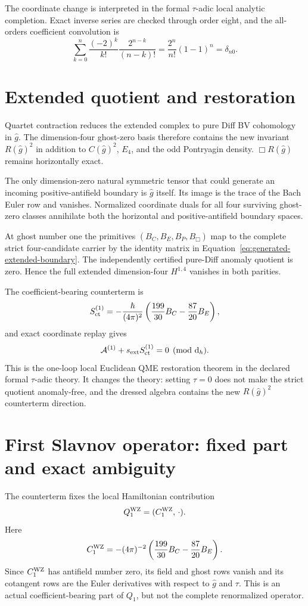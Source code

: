 \documentclass[11pt]{article}
\theoremstyle{definition}
\theoremstyle{remark}
\newcommand{\cA}{\mathcal A}
\newcommand{\dd}{\mathrm d}
\begin{document}
The coordinate change is interpreted in the formal $\tau$-adic local analytic
completion.  Exact inverse series are checked through order eight, and the
all-orders coefficient convolution is
\[
 \sum_{k=0}^{n}\frac{(-2)^k}{k!}\frac{2^{n-k}}{(n-k)!}
 =\frac{2^n}{n!}(1-1)^n=\delta_{n0}.
\]

\section{Extended quotient and restoration}

Quartet contraction reduces the extended complex to pure Diff BV cohomology
in $\widehat g$.  The dimension-four ghost-zero basis therefore contains the
new invariant $R(\widehat g)^2$ in addition to $C(\widehat g)^2$, $E_4$, and
the odd Pontryagin density.  $\Box R(\widehat g)$ remains horizontally exact.

The only dimension-zero natural symmetric tensor that could generate an
incoming positive-antifield boundary is $\widehat g$ itself.  Its image is the
trace of the Bach Euler row and vanishes.  Normalized coordinate duals for all
four surviving ghost-zero classes annihilate both the horizontal and
positive-antifield boundary spaces.

At ghost number one the primitives
$(B_C,B_E,B_P,B_{\Box})$ map to the complete strict four-candidate carrier by
the identity matrix in Equation~\ref{eq:generated-extended-boundary}.  The
independently certified pure-Diff anomaly quotient is zero.  Hence the full
extended dimension-four $H^{1,4}$ vanishes in both parities.

The coefficient-bearing counterterm is
\[
 S_{\rm ct}^{(1)}
 =-\frac{\hbar}{(4\pi)^2}
 \left(\frac{199}{30}B_C-\frac{87}{20}B_E\right),
\]
and exact coordinate replay gives
\[
 \cA^{(1)}+s_{\rm ext}S_{\rm ct}^{(1)}=0\pmod{\dd_h}.
\]
This is the one-loop local Euclidean QME restoration theorem in the declared
formal $\tau$-adic theory.  It changes the theory: setting $\tau=0$ does not
make the strict quotient anomaly-free, and the dressed algebra contains the
new $R(\widehat g)^2$ counterterm direction.

\section{First Slavnov operator: fixed part and exact ambiguity}

The counterterm fixes the local Hamiltonian contribution
\[
 Q_1^{\rm WZ}=(C_1^{\rm WZ},\,\cdot).
\]
Here
\[
 C_1^{\rm WZ}=-(4\pi)^{-2}
 \left(\frac{199}{30}B_C-\frac{87}{20}B_E\right).
\]
Since $C_1^{\rm WZ}$ has antifield number zero, its field and ghost rows
vanish and its cotangent rows are the Euler derivatives with respect to
$\widehat g$ and $\tau$.  This is an actual coefficient-bearing part of
$Q_1$, but not the complete renormalized operator.
\end{document}
